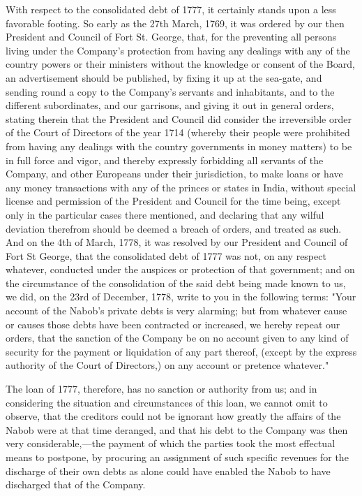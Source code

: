 With respect to the consolidated debt of 1777, it certainly stands upon a less favorable footing. So early as the 27th March, 1769, it was ordered by our then President and Council of Fort St. George, that, for the preventing all persons living under the Company's protection from having any dealings with any of the country powers or their ministers without the knowledge or consent of the Board, an advertisement should be published, by fixing it up at the sea-gate, and sending round a copy to the Company's servants and inhabitants, and to the different subordinates, and our garrisons, and giving it out in general orders, stating therein that the President and Council did consider the irreversible order of the Court of Directors of the year 1714 (whereby their people were prohibited from having any dealings with the country governments in money matters) to be in full force and vigor, and thereby expressly forbidding all servants of the Company, and other Europeans under their jurisdiction, to make loans or have any money transactions with any of the princes or states in India, without special license and permission of the President and Council for the time being, except only in the particular cases there mentioned, and declaring that any wilful deviation therefrom should be deemed a breach of orders, and treated as such. And on the 4th of March, 1778, it was resolved by our President and Council of Fort St George, that the consolidated debt of 1777 was not, on any respect whatever, conducted under the auspices or protection of that government; and on the circumstance of the consolidation of the said debt being made known to us, we did, on the 23rd of December, 1778, write to you in the following terms: "Your account of the Nabob's private debts is very alarming; but from whatever cause or causes those debts have been contracted or increased, we hereby repeat our orders, that the sanction of the Company be on no account given to any kind of security for the payment or liquidation of any part thereof, (except by the express authority of the Court of Directors,) on any account or pretence whatever."

The loan of 1777, therefore, has no sanction or authority from us; and in considering the situation and circumstances of this loan, we cannot omit to observe, that the creditors could not be ignorant how greatly the affairs of the Nabob were at that time deranged, and that his debt to the Company was then very considerable,—the payment of which the parties took the most effectual means to postpone, by procuring an assignment of such specific revenues for the discharge of their own debts as alone could have enabled the Nabob to have discharged that of the Company.

